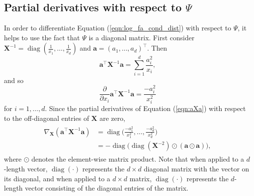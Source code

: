 \documentclass[msc,deptreport.inf]{infthesis} %
\newcommand{\matr}[1]{\mathbf{#1}}
\newcommand{\diag}{\mathop{\mathrm{diag}}}
\begin{document}
\subsection{Partial derivatives with respect to $\Psi$}

In order to differentiate Equation (\ref{eqn:log_fa_cond_dist}) with respect to $\Psi$, it helps to use the fact that $\Psi$ is a diagonal matrix. First consider $\matr{X}^{-1} = \diag(\frac{1}{x_1}, \dots, \frac{1}{x_d})$ and $\matr{a} = (a_1, \dots, a_d)^\intercal$. Then 
\begin{equation}\label{eqn:aXa}
	\matr{a}^\intercal \matr{X}^{-1} \matr{a} = \sum_{i=1}^d \frac{a_i^2}{x_i},
\end{equation}
and so
\begin{equation}
	\frac{\partial}{\partial x_i} \matr{a}^\intercal \matr{X}^{-1} \matr{a} = \frac{-a_i^2}{x_i^2}
\end{equation}
for $i=1, \dots, d$. Since the partial derivatives of Equation (\ref{eqn:aXa}) with respect to the off-diagonal entries of $\matr{X}$ are zero, 
\begin{align}\label{eqn:derivatives_diag_qaud_form}
\begin{split}
	\nabla_\matr{X} (\matr{a}^\intercal \matr{X}^{-1} \matr{a}) 
	& = \diag\Big({\frac{-a_1^2}{x_1^2}, \dots, \frac{-a_d^2}{x_d^2}}\Big) \\
	& = -\diag\Big(\diag(\matr{X}^{-2}) \odot (\matr{a} \odot \matr{a})\Big),
\end{split}
\end{align} 
where $\odot$ denotes the element-wise matrix product. Note that when applied to a $d$-length vector, $\diag(\cdot)$ represents the $d \times d$ diagonal matrix with the vector on its diagonal, and when applied to a $d \times d$ matrix, $\diag(\cdot)$ represents the $d$-length vector consisting of the diagonal entries of the matrix. 
\end{document}
